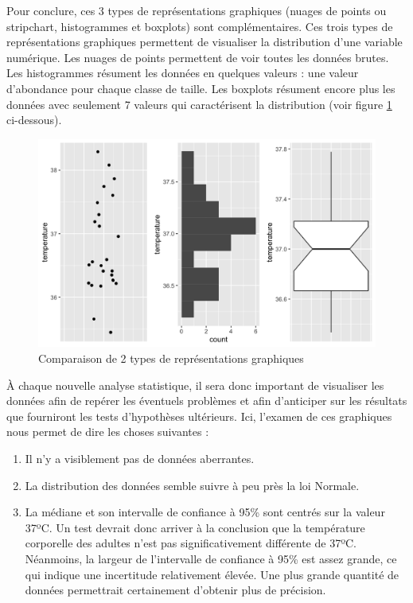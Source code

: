 \documentclass[a4paperpaper,]{article}
\providecommand{\tightlist}{%
  \setlength{\itemsep}{0pt}\setlength{\parskip}{0pt}}
\begin{document}
Pour conclure, ces 3 types de représentations graphiques (nuages de points ou stripchart, histogrammes et boxplots) sont complémentaires. Ces trois types de représentations graphiques permettent de visualiser la distribution d'une variable numérique. Les nuages de points permettent de voir toutes les données brutes. Les histogrammes résument les données en quelques valeurs : une valeur d'abondance pour chaque classe de taille. Les boxplots résument encore plus les données avec seulement 7 valeurs qui caractérisent la distribution (voir figure \ref{fig:compdistr} ci-dessous).

\begin{figure}[htpb]

{\centering \includegraphics[width=0.9\linewidth]{figure/compdistr-1} 

}

\caption{Comparaison de 2 types de représentations graphiques}\label{fig:compdistr}
\end{figure}

À chaque nouvelle analyse statistique, il sera donc important de visualiser les données afin de repérer les éventuels problèmes et afin d'anticiper sur les résultats que fourniront les tests d'hypothèses ultérieurs. Ici, l'examen de ces graphiques nous permet de dire les choses suivantes :

\begin{enumerate}
\def\labelenumi{\arabic{enumi}.}
\tightlist
\item
  Il n'y a visiblement pas de données aberrantes.
\item
  La distribution des données semble suivre à peu près la loi Normale.
\item
  La médiane et son intervalle de confiance à 95\% sont centrés sur la valeur 37ºC. Un test devrait donc arriver à la conclusion que la température corporelle des adultes n'est pas significativement différente de 37ºC. Néanmoins, la largeur de l'intervalle de confiance à 95\% est assez grande, ce qui indique une incertitude relativement élevée. Une plus grande quantité de données permettrait certainement d'obtenir plus de précision.
\end{enumerate}
\end{document}
